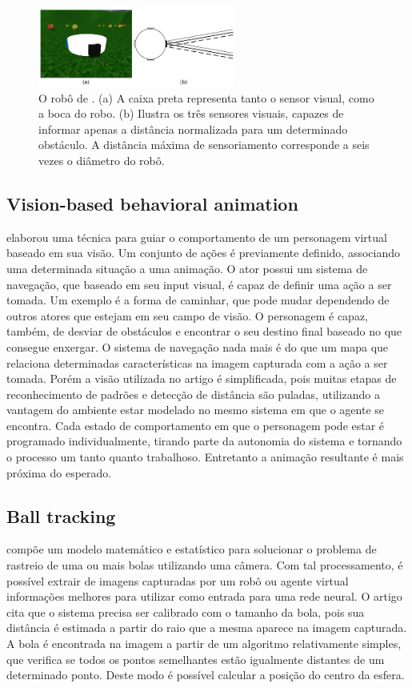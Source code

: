 \documentclass{article}
\begin{document}
\begin{figure}[ht]
  \centering
  \includegraphics[height=100px]{images/nogueira_robot.png}
  \caption{O robô de . (a) A caixa preta representa tanto o sensor visual, como a boca do robo. (b) Ilustra os três sensores visuais, capazes de informar apenas a distância normalizada para um determinado obstáculo. A distância máxima de sensoriamento corresponde a seis vezes o diâmetro do robô. }
  \label{fig:nogueira:fig1}
\end{figure}

\subsection{Vision-based behavioral animation}
 elaborou uma técnica para guiar o comportamento de um personagem virtual baseado em sua visão. Um conjunto de ações é previamente definido, associando uma determinada situação a uma animação. O ator possui um sistema de navegação, que baseado em seu input visual, é capaz de definir uma ação a ser tomada. Um exemplo é a forma de caminhar, que pode mudar dependendo de outros atores que estejam em seu campo de visão. O personagem é capaz, também, de desviar de obstáculos e encontrar o seu destino final baseado no que consegue enxergar. O sistema de navegação nada mais é do que um mapa que relaciona determinadas características na imagem capturada com a ação a ser tomada. Porém a visão utilizada no artigo é simplificada, pois muitas etapas de reconhecimento de padrões e detecção de distância são puladas, utilizando a vantagem do ambiente estar modelado no mesmo sistema em que o agente se encontra. Cada estado de comportamento em que o personagem pode estar é programado individualmente, tirando parte da autonomia do sistema e tornando o processo um tanto quanto trabalhoso. Entretanto a animação resultante é mais próxima do esperado.

\subsection{Ball tracking}
 compõe um modelo matemático e estatístico para solucionar o problema de rastreio de uma ou mais bolas utilizando uma câmera. Com tal processamento, é possível extrair de imagens capturadas por um robô ou agente virtual informações melhores para utilizar como entrada para uma rede neural. O artigo cita que o sistema precisa ser calibrado com o tamanho da bola, pois sua distância é estimada a partir do raio que a mesma aparece na imagem capturada. A bola é encontrada na imagem a partir de um algoritmo relativamente simples, que verifica se todos os pontos semelhantes estão igualmente distantes de um determinado ponto. Deste modo é possível calcular a posição do centro da esfera.
\end{document}
